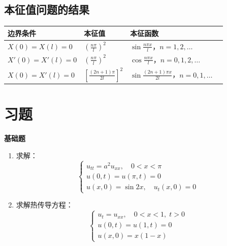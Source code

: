 \subsection{本征值问题的结果}

\begin{table}[htbp]
\centering
\begin{tabular}{llll}
\toprule
\textbf{边界条件} & \textbf{本征值} & \textbf{本征函数} \\
\midrule
$X(0) = X(l) = 0$ & $\left(\frac{n\pi}{l}\right)^2$ & $\sin\frac{n\pi x}{l}$，$n = 1, 2, \ldots$ \\
$X'(0) = X'(l) = 0$ & $\left(\frac{n\pi}{l}\right)^2$ & $\cos\frac{n\pi x}{l}$，$n = 0, 1, 2, \ldots$ \\
$X(0) = X'(l) = 0$ & $\left[\frac{(2n+1)\pi}{2l}\right]^2$ & $\sin\frac{(2n+1)\pi x}{2l}$，$n = 0, 1, \ldots$ \\
\bottomrule
\end{tabular}
\end{table}

\section{习题}

\textbf{基础题}

\begin{enumerate}
    \item 求解：
    \begin{equation}
        \begin{cases}
            u_{tt} = a^2 u_{xx}, \quad 0 < x < \pi \\
            u(0, t) = u(\pi, t) = 0 \\
            u(x, 0) = \sin 2x, \quad u_t(x, 0) = 0
        \end{cases}
    \end{equation}
    
    \item 求解热传导方程：
    \begin{equation}
        \begin{cases}
            u_t = u_{xx}, \quad 0 < x < 1, \; t > 0 \\
            u(0, t) = u(1, t) = 0 \\
            u(x, 0) = x(1-x)
        \end{cases}
    \end{equation}
\end{enumerate}

